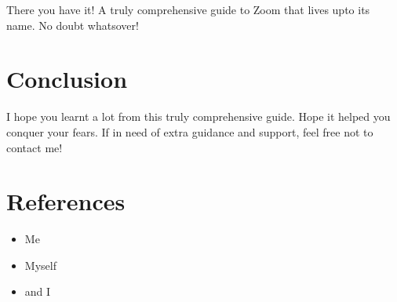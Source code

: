 \documentclass[14pt]{report}
\begin{document}
                            There you have it! A truly comprehensive guide to Zoom that lives upto its name. No doubt whatsover!

                        
    \newpage


	\chapter*{Conclusion}\label{chapter6}
		
                            I hope you learnt a lot from this truly comprehensive guide. Hope it helped you conquer your fears. If in need of extra guidance and support, feel free not to contact me!
                        
	\newpage


	\chapter*{References}\label{chapter7}
		
                            
            \begin{itemize}
                \item Me
                \item Myself
                \item and I
            \end{itemize}

	\newpage
\end{document}
